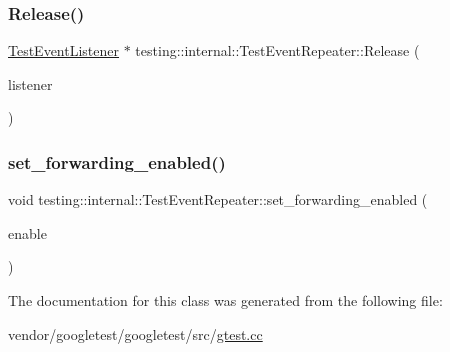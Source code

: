 \subsubsection{\texorpdfstring{Release()}{Release()}}
{\footnotesize\ttfamily \hyperlink{classtesting_1_1_test_event_listener}{Test\+Event\+Listener} $\ast$ testing\+::internal\+::\+Test\+Event\+Repeater\+::\+Release (\begin{DoxyParamCaption}\item[{\hyperlink{classtesting_1_1_test_event_listener}{Test\+Event\+Listener} $\ast$}]{listener }\end{DoxyParamCaption})}

\mbox{\label{classtesting_1_1internal_1_1_test_event_repeater_a86c52e311b70598a385a0589277e92e0}} 
\subsubsection{\texorpdfstring{set\+\_\+forwarding\+\_\+enabled()}{set\_forwarding\_enabled()}}
{\footnotesize\ttfamily void testing\+::internal\+::\+Test\+Event\+Repeater\+::set\+\_\+forwarding\+\_\+enabled (\begin{DoxyParamCaption}\item[{bool}]{enable }\end{DoxyParamCaption})\hspace{0.3cm}{\ttfamily [inline]}}



The documentation for this class was generated from the following file\+:\begin{DoxyCompactItemize}
\item 
vendor/googletest/googletest/src/\hyperlink{gtest_8cc}{gtest.\+cc}\end{DoxyCompactItemize}
